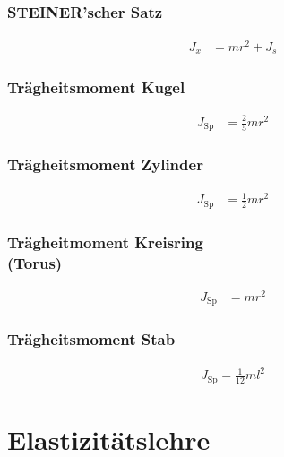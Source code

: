 \subsection*{}%

\begin{multicols}{2}{}
\subsubsection*{STEINER'scher Satz}
\begin{align*}
J_x&=mr^2+J_s
\end{align*}

\subsubsection*{Trägheitsmoment Kugel}
\begin{align*}
J_\text{Sp}&=\frac{2}{5}mr^2
\end{align*}


\subsubsection*{Trägheitsmoment Zylinder}
\begin{align*}
J_\text{Sp}&=\frac{1}{2}mr^2
\end{align*}


\subsubsection*{Trägheitmoment Kreisring \\(Torus)}
\begin{align*}
J_\text{Sp}&=mr^2
\end{align*}


\subsubsection*{Trägheitsmoment Stab}
\begin{align*}
J_\text{Sp}=\frac{1}{12}ml^2
\end{align*}
\end{multicols}


\newpage
\section{Elastizitätslehre}
\subsection*{}%

